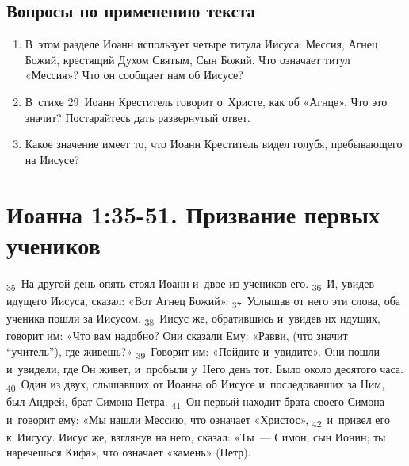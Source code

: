 \documentclass[a4paper,12pt]{article}
\begin{document}
\subsection*{Вопросы по применению текста} 
\begin{enumerate}
    \item В~этом разделе Иоанн использует четыре титула Иисуса: Мессия, Агнец Божий, крестящий Духом Святым, Сын Божий. Что означает титул «Мессия»? Что он сообщает нам об Иисусе? 
    
    \myline
    
    \myline
    \item В~стихе 29~Иоанн Креститель говорит о~Христе, как об «Агнце». Что это значит? Постарайтесь дать развернутый ответ. 
    
    \myline
    
    \myline
    \item Какое значение имеет то, что Иоанн Креститель видел голубя, пребывающего на Иисусе? 
    
    \myline
    
    \myline
\end{enumerate}



\section{Иоанна 1:35-51. Призвание первых учеников}

\textsubscript{35}~На другой день опять стоял Иоанн и~двое из учеников его.
\textsubscript{36}~И, увидев идущего Иисуса, сказал: «Вот Агнец Божий».
\textsubscript{37}~Услышав от него эти слова, оба ученика пошли за Иисусом.
\textsubscript{38}~Иисус же, обратившись и~увидев их идущих, говорит им: «Что вам надобно? Они сказали Ему: «Равви, (что значит “учитель”), где живешь?»
\textsubscript{39}~Говорит им: «Пойдите и~увидите». Они пошли и~увидели, где Он живет, и~пробыли у~Него день тот. Было около десятого часа.
\textsubscript{40}~Один из двух, слышавших от Иоанна об Иисусе и~последовавших за Ним, был Андрей, брат Симона Петра.
\textsubscript{41}~Он первый находит брата своего Симона и~говорит ему: «Мы нашли Мессию, что означает «Христос»,
\textsubscript{42}~и~привел его к~Иисусу. Иисус же, взглянув на него, сказал: «Ты~--- Симон, сын Ионин; ты наречешься Кифа», что означает «камень» (Петр). 
\end{document}
